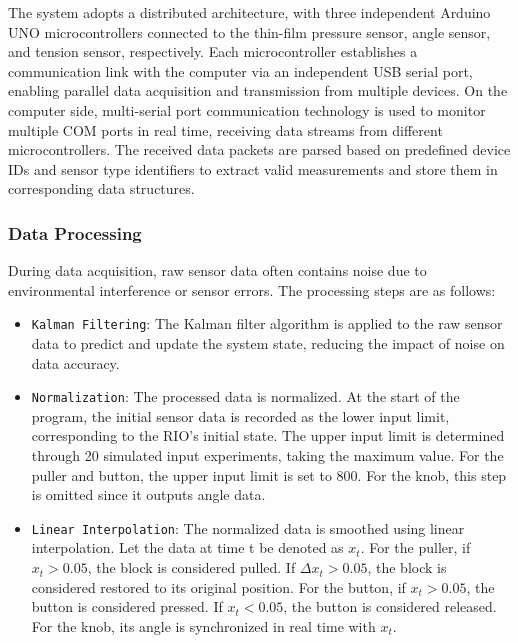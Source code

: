 \documentclass[runningheads]{llncs}
\begin{document}
The system adopts a distributed architecture, with three independent Arduino UNO microcontrollers connected to the thin-film pressure sensor, angle sensor, and tension sensor, respectively. Each microcontroller establishes a communication link with the computer via an independent USB serial port, enabling parallel data acquisition and transmission from multiple devices. On the computer side, multi-serial port communication technology is used to monitor multiple COM ports in real time, receiving data streams from different microcontrollers. The received data packets are parsed based on predefined device IDs and sensor type identifiers to extract valid measurements and store them in corresponding data structures.

\subsubsection{Data Processing}
During data acquisition, raw sensor data often contains noise due to environmental interference or sensor errors. The processing steps are as follows:

\begin{itemize}
  \item {\texttt{Kalman Filtering}}: The Kalman filter algorithm is applied to the raw sensor data to predict and update the system state, reducing the impact of noise on data accuracy.

  \item {\texttt{Normalization}}: The processed data is normalized. At the start of the program, the initial sensor data is recorded as the lower input limit, corresponding to the RIO's initial state. The upper input limit is determined through 20 simulated input experiments, taking the maximum value. For the puller and button, the upper input limit is set to 800. For the knob, this step is omitted since it outputs angle data.

  \item {\texttt{Linear Interpolation}}: The normalized data is smoothed using linear interpolation. Let the data at time t be denoted as $x_{t}$. For the puller, if $x_{t}  > 0.05$, the block is considered pulled. If $\Delta x_{t} > 0.05$, the block is considered restored to its original position. For the button, if $x_{t}  > 0.05$, the button is considered pressed. If $x_{t} < 0.05$, the button is considered released. For the knob, its angle is synchronized in real time with $x_{t}$.
\end{itemize}
\end{document}
